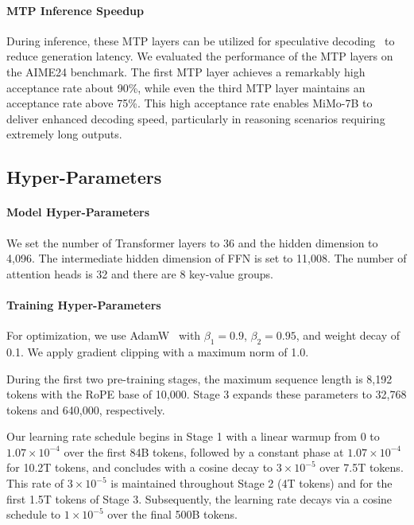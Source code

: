 \documentclass[11pt, a4paper, logo, copyright, nonumbering]{xiaomi}
\newcommand{\mimo}{MiMo-7B}
\begin{document}
\paragraph{MTP Inference Speedup} 
During inference, these MTP layers can be utilized for speculative decoding~\citep{leviathan2023fast,xia2022speculative} to reduce generation latency. 
We evaluated the performance of the MTP layers on the AIME24 benchmark. 
The first MTP layer achieves a remarkably high acceptance rate about 90\%, while even the third MTP layer maintains an acceptance rate above 75\%.
This high acceptance rate enables \mimo{} to deliver enhanced decoding speed, particularly in reasoning scenarios requiring extremely long outputs.


\subsection{Hyper-Parameters}

\paragraph{Model Hyper-Parameters} 
We set the number of Transformer layers to 36 and the hidden dimension to 4,096. The intermediate hidden dimension of FFN is set to 11,008. The number of attention heads is 32 and there are 8 key-value groups. 


\paragraph{Training Hyper-Parameters} 
For optimization, we use AdamW~\citep{loshchilov2017decoupled} with $\beta_1 = 0.9$, $\beta_2 = 0.95$, and weight decay of 0.1. We apply gradient clipping with a maximum norm of 1.0.

During the first two pre-training stages, the maximum sequence length is 8,192 tokens with the RoPE base of 10,000. 
Stage 3 expands these parameters to 32,768 tokens and 640,000, respectively.

Our learning rate schedule begins in Stage 1 with a linear warmup from 0 to $1.07\times10^{-4}$ over the first 84B tokens, followed by a constant phase at $1.07\times10^{-4}$ for 10.2T tokens, and concludes with a cosine decay to $3\times10^{-5}$ over 7.5T tokens. 
This rate of $3\times10^{-5}$ is maintained throughout Stage 2 (4T tokens) and for the first 1.5T tokens of Stage 3. Subsequently, the learning rate decays via a cosine schedule to $1\times10^{-5}$ over the final 500B tokens.
\end{document}
